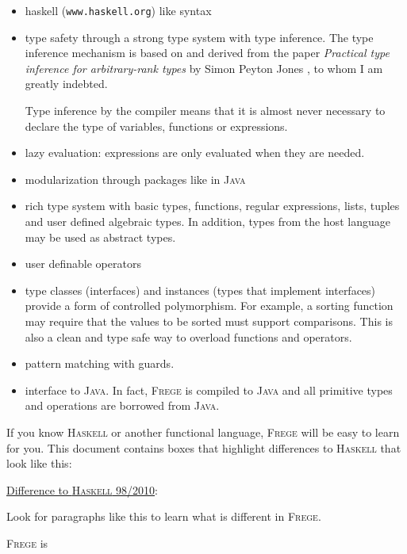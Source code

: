\documentclass[letterpaper,12pt]{report}
\newcommand{\boxquote}[3]{
\begin{center}
\colorbox{#1}%
{\parbox{0.9\textwidth}{
\sf
\underline{#2}:
#3
}}
\end{center}}
\newcommand{\hasdiff}[1]{\boxquote{rot}{Difference to \haskell{} 98/2010}{#1}}
\newcommand{\haskell}[0]{\textsc{Haskell}}
\newcommand{\frege}[0]{\textsc{Frege}}
\newcommand{\java}[0]{\textsc{Java}}
\begin{document}
\begin{itemize}

\item haskell{} ({\tt www.haskell.org}) like syntax

\item type safety through a strong type system with type inference. The
type inference mechanism is based on and derived from the paper
\emph{Practical type inference for arbitrary-rank types} by Simon
Peyton Jones \cite{ptifart}, to whom I am greatly indebted.

Type inference by the compiler means that it is
almost never necessary to declare the type of variables, functions or
expressions.

\item lazy evaluation: expressions are only evaluated when they are
needed.

\item modularization through packages like in \java{}

\item rich type system with basic types, functions, regular expressions,
lists, tuples and user defined algebraic types.
In addition, types from the host language may be used as abstract
types.

\item user definable operators

\item type classes (interfaces) and instances (types that
implement interfaces) provide a form of controlled polymorphism. For
example, a sorting function may require that the values to be sorted
must support comparisons. This is also a clean and type safe way to
overload functions and operators.

\item pattern matching with guards.

\item interface to \java{}. In fact, \frege{} is
compiled to \java{} and
all primitive types and operations are borrowed from \java{}.

\end{itemize}

If you know \haskell{} or another functional language,
\frege{} will be easy to learn for you. This document contains boxes
that highlight differences to \haskell{} that look like this:

\hasdiff{
Look for paragraphs like this to learn what is different in \frege{}.
}

\frege{} is
\end{document}
